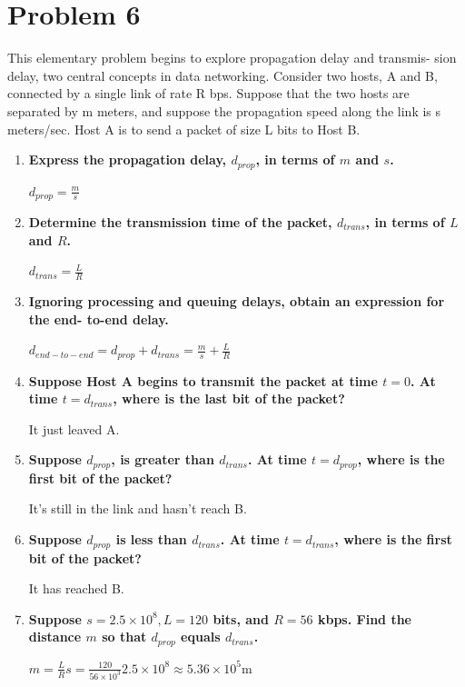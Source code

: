 \documentclass[11pt]{article}
\newenvironment{qparts}{\begin{enumerate}[{(}a{)}]}{\end{enumerate}}
\begin{document}
\newpage
\section{Problem 6}

This elementary problem begins to explore propagation delay and transmis- sion delay, two central concepts in data networking. Consider two hosts, A and B, connected by a single link of rate R bps. Suppose that the two hosts are separated by m meters, and suppose the propagation speed along the link is s meters/sec. Host A is to send a packet of size L bits to Host B.

\begin{qparts}

	\item \textbf{Express the propagation delay, $d_{prop}$, in terms of $m$ and $s$.}
	
	$d_{prop} = \frac{m}{s}$
	
	\item \textbf{Determine the transmission time of the packet, $d_{trans}$, in terms of $L$ and $R$.}

	$d_{trans} = \frac{L}{R}$
	
	\item \textbf{Ignoring processing and queuing delays, obtain an expression for the end- to-end delay.}
	
	$d_{end-to-end} = d_{prop} + d_{trans} = \frac{m}{s} + \frac{L}{R}$
	
	\item \textbf{Suppose Host A begins to transmit the packet at time $t = 0$. At time $t = d_{trans}$, where is the last bit of the packet?}
	
	It just leaved A.
	
	\item \textbf{Suppose $d_{prop}$, is greater than $d_{trans}$. At time $t = d_{prop}$, where is the first bit of the packet?}

	It's still in the link and hasn't reach B.
	
	\item \textbf{Suppose $d_{prop}$ is less than $d_{trans}$. At time $t = d_{trans}$, where is the first bit of the packet?}
	
	It has reached B.
	
	\item \textbf{Suppose $s = 2.5 \times 10^8 , L = 120$ bits, and $R = 56$ kbps. Find the distance $m$ so that $d_{prop}$ equals $d_{trans}$.}
	
	$m =  \frac{L}{R} s = \frac{120}{56 \times 10^3}2.5 \times 10^8 \approx 5.36 \times 10^5$m

	

\end{qparts}
\end{document}

